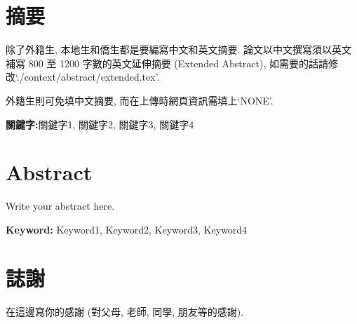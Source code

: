 \setcounter{page}{1}
\newpage
{}
\chapter*{摘要}
\pagestyle{plain}

除了外籍生, 本地生和僑生都是要編寫中文和英文摘要. 論文以中文撰寫須以英文補寫 800 至 1200 字數的英文延伸摘要 (Extended Abstract), 如需要的話請修改`./context/abstract/extended.tex'.

外籍生則可免填中文摘要, 而在上傳時網頁資訊需填上`NONE'.

\par{\noindent \bf 關鍵字:}{關鍵字1, 關鍵字2, 關鍵字3, 關鍵字4}
\clearpage
{}

\newpage
{}
\chapter*{Abstract}
\pagestyle{plain}

Write your abstract here.

\par{\noindent \bf Keyword:}{ Keyword1, Keyword2, Keyword3, Keyword4}
\clearpage
{}


\newpage
{}
\chapter*{誌謝}
\pagestyle{plain}

在這邊寫你的感謝 (對父母, 老師, 同學, 朋友等的感謝).

\clearpage
{}



\renewcommand*\contentsname{Table of Contents}
\singlespacing
\newpage
{}
\pagestyle{plain}
\tableofcontents
\clearpage
{}

\listoftables
\listoffigures

\newpage
{}
